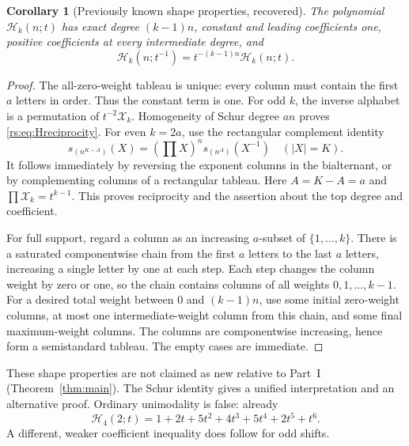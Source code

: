 \documentclass[11pt]{article}
\newtheorem{corollary}[theorem]{Corollary}
\theoremstyle{definition}
\theoremstyle{remark}
\newcommand{\Ht}{\mathcal H}
\newcommand{\XX}{\mathcal X}
\theoremstyle{definition}
\theoremstyle{plain}
\numberwithin{equation}{section}
\begin{document}
\begin{corollary}[Previously known shape properties, recovered]
\label{rs:cor:shape}
The polynomial $\Ht_k(n;t)$ has exact degree $(k-1)n$, constant and leading
coefficients one, positive coefficients at every intermediate degree, and
\begin{equation}
 \Ht_k(n;t^{-1})=t^{-(k-1)n}\Ht_k(n;t).
 \label{rs:eq:Hreciprocity}
\end{equation}
\end{corollary}
\begin{proof}
The all-zero-weight tableau is unique: every column must contain the first
$a$ letters in order. Thus the constant term is one.
For odd $k$, the inverse alphabet is a permutation of $t^{-2}\XX_k$.
Homogeneity of Schur degree $an$ proves \eqref{rs:eq:Hreciprocity}.
For even $k=2a$, use the rectangular complement identity
\begin{equation}
 s_{(n^{K-A})}(X)=(\prod X)^n s_{(n^A)}(X^{-1})
 \quad(|X|=K).
 \label{rs:eq:complement}
\end{equation}
It follows immediately by reversing the exponent columns in the
bialternant, or by complementing columns of a rectangular tableau.
Here $A=K-A=a$ and $\prod\XX_k=t^{k-1}$. This proves reciprocity and the
assertion about the top degree and coefficient.

For full support, regard a column as an increasing $a$-subset of
$\{1,\ldots,k\}$. There is a saturated componentwise chain from the first
$a$ letters to the last $a$ letters, increasing a single letter by one at
each step. Each step changes the column weight by zero or one, so the chain
contains columns of all weights $0,1,\ldots,k-1$. For a desired total
weight between $0$ and $(k-1)n$, use some initial zero-weight columns, at
most one intermediate-weight column from this chain, and some final
maximum-weight columns. The columns are componentwise increasing, hence
form a semistandard tableau. The empty cases are immediate.
\end{proof}

These shape properties are not claimed as new relative to Part~I (Theorem~\ref{thm:main}).
The Schur identity gives a unified interpretation and an alternative proof.
Ordinary unimodality is false: already
\[
 \Ht_4(2;t)=1+2t+5t^2+4t^3+5t^4+2t^5+t^6.
\]
A different, weaker coefficient inequality does follow for odd shifts.
\end{document}
